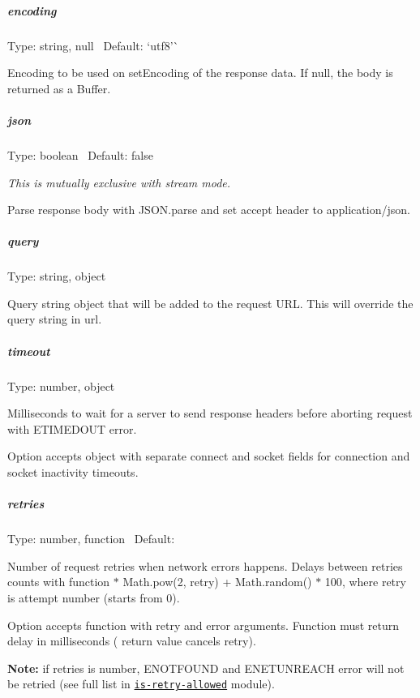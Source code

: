 \subparagraph*{encoding}

Type\+: {\ttfamily string}, {\ttfamily null}~\newline
 Default\+: `\textquotesingle{}utf8'\`{}

Encoding to be used on {\ttfamily set\+Encoding} of the response data. If {\ttfamily null}, the body is returned as a Buffer.

\subparagraph*{json}

Type\+: {\ttfamily boolean}~\newline
 Default\+: {\ttfamily false}

{\itshape This is mutually exclusive with stream mode.}

Parse response body with {\ttfamily J\+S\+O\+N.\+parse} and set {\ttfamily accept} header to {\ttfamily application/json}.

\subparagraph*{query}

Type\+: {\ttfamily string}, {\ttfamily object}~\newline


Query string object that will be added to the request U\+RL. This will override the query string in {\ttfamily url}.

\subparagraph*{timeout}

Type\+: {\ttfamily number}, {\ttfamily object}

Milliseconds to wait for a server to send response headers before aborting request with {\ttfamily E\+T\+I\+M\+E\+D\+O\+UT} error.

Option accepts {\ttfamily object} with separate {\ttfamily connect} and {\ttfamily socket} fields for connection and socket inactivity timeouts.

\subparagraph*{retries}

Type\+: {\ttfamily number}, {\ttfamily function}~\newline
 Default\+: {}

Number of request retries when network errors happens. Delays between retries counts with function { $\ast$ Math.\+pow(2, retry) + Math.\+random() $\ast$ 100}, where {\ttfamily retry} is attempt number (starts from 0).

Option accepts {\ttfamily function} with {\ttfamily retry} and {\ttfamily error} arguments. Function must return delay in milliseconds ({} return value cancels retry).

{\bfseries Note\+:} if {\ttfamily retries} is {\ttfamily number}, {\ttfamily E\+N\+O\+T\+F\+O\+U\+ND} and {\ttfamily E\+N\+E\+T\+U\+N\+R\+E\+A\+CH} error will not be retried (see full list in \href{https://github.com/floatdrop/is-retry-allowed/blob/master/index.js#L12}{\tt {\ttfamily is-\/retry-\/allowed}} module).

